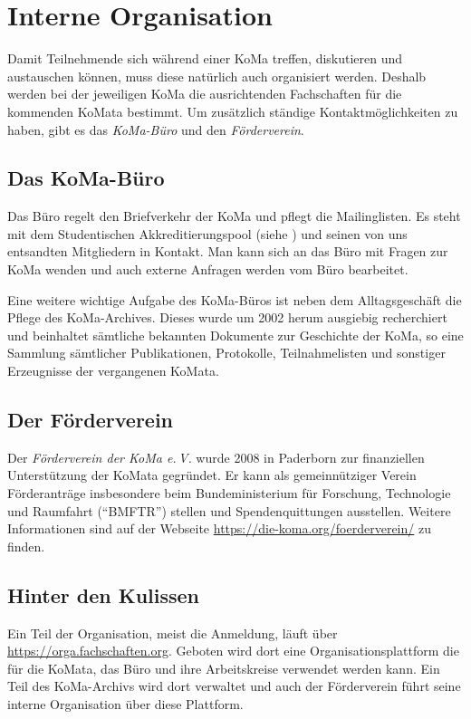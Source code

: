 \chapter{Interne Organisation}

Damit Teilnehmende sich während einer KoMa treffen, diskutieren und austauschen können, muss diese natürlich auch organisiert werden.
Deshalb werden bei der jeweiligen KoMa die ausrichtenden Fachschaften für die kommenden KoMata bestimmt.
Um zusätzlich ständige Kontaktmöglichkeiten zu haben, gibt es das \emph{KoMa-Büro} und den \emph{Förderverein}.

\section{Das KoMa-Büro}
Das Büro regelt den Briefverkehr der KoMa und pflegt die Mailinglisten.
Es steht mit dem Studentischen Akkreditierungspool (siehe ) und seinen von uns entsandten Mitgliedern in Kontakt.
Man kann sich an das Büro mit Fragen zur KoMa wenden und auch externe Anfragen werden vom Büro bearbeitet.

Eine weitere wichtige Aufgabe des KoMa-Büros ist neben dem Alltagsgeschäft die Pflege des KoMa-Archives.
Dieses wurde um 2002 herum ausgiebig recherchiert und beinhaltet sämtliche bekannten Dokumente zur Geschichte der KoMa, so eine Sammlung sämtlicher Publikationen, Protokolle, Teilnahmelisten und sonstiger Erzeugnisse der vergangenen KoMata.

\section{Der Förderverein}
Der \emph{Förderverein der KoMa e.\,V.} wurde 2008 in Paderborn zur finanziellen Unterstützung der KoMata gegründet.
Er kann als gemeinnütziger Verein Förderanträge insbesondere beim Bundeministerium für Forschung, Technologie und Raumfahrt (\enquote{BMFTR}) stellen und Spendenquittungen ausstellen.
Weitere Informationen sind auf der Webseite \url{https://die-koma.org/foerderverein/} zu finden.

\section{Hinter den Kulissen}
Ein Teil der Organisation, meist die Anmeldung, läuft über \url{https://orga.fachschaften.org}.
Geboten wird dort eine Organisationsplattform die für die KoMata, das Büro und ihre Arbeitskreise verwendet werden kann.
Ein Teil des KoMa-Archivs wird dort verwaltet und auch der Förderverein führt seine interne Organisation über diese Plattform.
